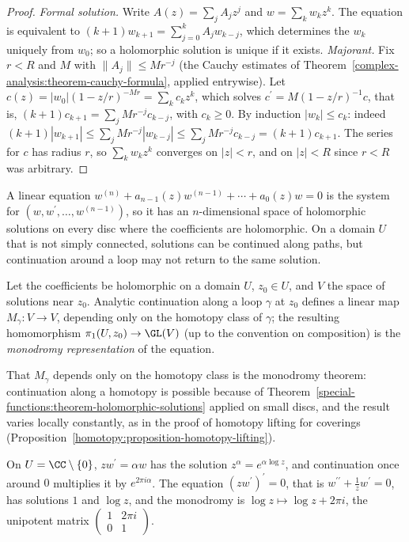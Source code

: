 \begin{proof}
\emph{Formal solution.} Write $A(z) = \sum_jA_jz^j$ and $w = \sum_kw_kz^k$. The equation is equivalent to $(k + 1)w_{k+1} = \sum_{j=0}^kA_jw_{k-j}$, which determines the $w_k$ uniquely from $w_0$; so a holomorphic
solution is unique if it exists.
\emph{Majorant.} Fix $r < R$ and $M$ with $\|A_j\| \leq Mr^{-j}$ (the Cauchy estimates of Theorem~\ref{complex-analysis:theorem-cauchy-formula}, applied entrywise). Let $c(z) = |w_0|(1 - z/r)^{-Mr} = \sum_kc_kz^k$, which solves
$c^{\prime} = M(1 - z/r)^{-1}c$, that is, $(k + 1)c_{k+1} = \sum_jMr^{-j}c_{k-j}$, with $c_k \geq 0$. By induction $|w_k| \leq c_k$: indeed
$(k + 1)|w_{k+1}| \leq \sum_jMr^{-j}|w_{k-j}| \leq \sum_jMr^{-j}c_{k-j} = (k + 1)c_{k+1}$. The series for $c$ has radius $r$, so $\sum_kw_kz^k$ converges on $|z| < r$, and on $|z| < R$ since $r < R$ was arbitrary.
\end{proof}

A linear equation $w^{(n)} + a_{n-1}(z)w^{(n-1)} + \cdots + a_0(z)w = 0$ is the system for $(w, w^{\prime}, \ldots, w^{(n-1)})$, so it has an $n$-dimensional space of holomorphic solutions on every disc where the coefficients are
holomorphic. On a domain $U$ that is not simply connected, solutions can be continued along paths, but continuation around a loop may not return to the same solution.

\begin{definition}\label{special-functions:definition-monodromy}
Let the coefficients be holomorphic on a domain $U$, $z_0 \in U$, and $V$ the space of solutions near $z_0$. Analytic continuation along a loop $\gamma$ at $z_0$ defines a linear map $M_\gamma \colon V \to V$, depending only on the
homotopy class of $\gamma$; the resulting homomorphism $\pi_1(U, z_0) \to \GL(V)$ (up to the convention on composition) is the \emph{monodromy representation} of the equation.
\end{definition}

That $M_\gamma$ depends only on the homotopy class is the monodromy theorem: continuation along a homotopy is possible because of Theorem~\ref{special-functions:theorem-holomorphic-solutions} applied on small discs, and the
result varies locally constantly, as in the proof of homotopy lifting for coverings (Proposition~\ref{homotopy:proposition-homotopy-lifting}).

\begin{example}\label{special-functions:example-monodromy}
On $U = \CC \setminus \{0\}$, $zw^{\prime} = \alpha w$ has the solution $z^\alpha = e^{\alpha\log z}$, and continuation once around $0$ multiplies it by $e^{2\pi i\alpha}$. The equation $(zw^{\prime})^{\prime} = 0$, that is
$w^{\prime\prime} + \frac1zw^{\prime} = 0$, has solutions $1$ and $\log z$, and the monodromy is $\log z \mapsto \log z + 2\pi i$, the unipotent matrix $\begin{pmatrix} 1 & 2\pi i \\ 0 & 1 \end{pmatrix}$.
\end{example}

